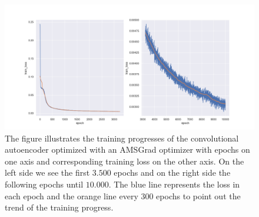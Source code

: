 \begin{figure}
\begin{center}
\includegraphics[width=\linewidth]{convolutional_AE_training_progress}
\end{center}
\caption{The figure illustrates the training progresses of the convolutional autoencoder optimized with an AMSGrad optimizer  with epochs on one axis and corresponding training loss on the other axis. On the left side we see the first $3.500$ epochs and on the right side the following epochs until $10.000$. The blue line represents the loss in each epoch and the orange line every $300$ epochs to point out the trend of the training progress.}\label{fig:convolutional_AE_training_progress}
\end{figure}
